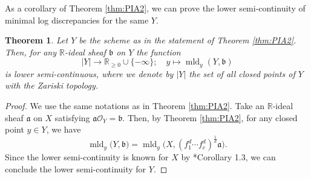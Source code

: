 \documentclass[a4paper,11pt]{amsart}
\newtheorem{thm}{Theorem}[section]
\theoremstyle{definition}
\theoremstyle{remark}
\begin{document}
As a corollary of Theorem \ref{thm:PIA2}, we can prove the lower semi-continuity of minimal log discrepancies for the same $Y$. 

\begin{thm}\label{thm:LSC_general}
Let $Y$ be the scheme as in the statement of Theorem \ref{thm:PIA2}. 
Then, for any $\mathbb{R}$-ideal sheaf $\mathfrak{b}$ on $Y$ the function 
\[
|Y| \to \mathbb{R}_{\ge 0} \cup \{ - \infty \}; \quad y \mapsto \operatorname{mld}_y(Y,\mathfrak{b})
\]
is lower semi-continuous, where we denote by $|Y|$ the set of all closed points of $Y$ with the Zariski topology. 
\end{thm}
\begin{proof}
We use the same notations as in Theorem \ref{thm:PIA2}. 
Take an $\mathbb{R}$-ideal sheaf $\mathfrak{a}$ on $X$ satisfying $\mathfrak{a} \mathcal{O}_Y = \mathfrak{b}$. Then, by Theorem \ref{thm:PIA2}, for any closed point $y \in Y$, we have 
\[
\operatorname{mld}_y \bigl( Y, \mathfrak{b} \bigr) = 
\operatorname{mld}_y \bigl( X, (f_1 ^d \cdots f_{c} ^d)^{\frac{1}{d}} \mathfrak{a} \bigr). 
\]
Since the lower semi-continuity is known for $X$ by \cite{Nak16}*{Corollary 1.3}, 
we can conclude the lower semi-continuity for $Y$. 
\end{proof}
\end{document}
